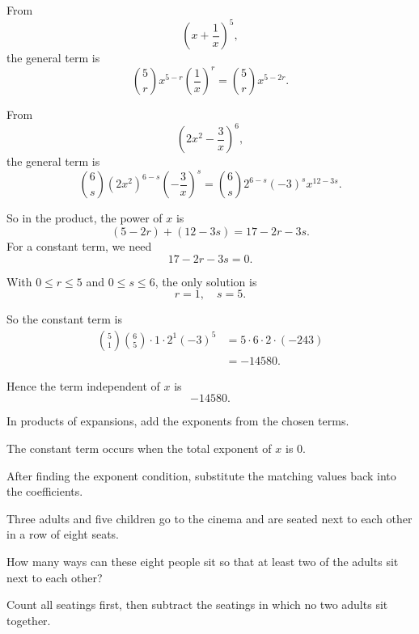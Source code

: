 \begin{solution}
From
\[
\left(x+\frac{1}{x}\right)^5,
\]
the general term is
\[
\binom{5}{r}x^{5-r}\left(\frac{1}{x}\right)^r=\binom{5}{r}x^{5-2r}.
\]

From
\[
\left(2x^2-\frac{3}{x}\right)^6,
\]
the general term is
\[
\binom{6}{s}(2x^2)^{6-s}\left(-\frac{3}{x}\right)^s
=\binom{6}{s}2^{6-s}(-3)^s x^{12-3s}.
\]

So in the product, the power of $x$ is
\[
(5-2r)+(12-3s)=17-2r-3s.
\]
For a constant term, we need
\[
17-2r-3s=0.
\]

With $0\le r\le 5$ and $0\le s\le 6$, the only solution is
\[
r=1,\quad s=5.
\]

So the constant term is
\begin{align*}
\binom{5}{1}\binom{6}{5}\cdot 1 \cdot 2^{1}(-3)^5
&= 5\cdot 6\cdot 2\cdot (-243) \\
&= -14580.
\end{align*}

Hence the term independent of $x$ is
\[
\boxed{-14580}.
\]
\end{solution}

\begin{takeaways}
\item In products of expansions, add the exponents from the chosen terms.
\item The constant term occurs when the total exponent of $x$ is $0$.
\item After finding the exponent condition, substitute the matching values back into the coefficients.
\end{takeaways}

\begin{problem}
Three adults and five children go to the cinema and are seated next to each other in a row of eight seats.

How many ways can these eight people sit so that at least two of the adults sit next to each other?
\end{problem}

\begin{hint}
Count all seatings first, then subtract the seatings in which no two adults sit together.
\end{hint}

